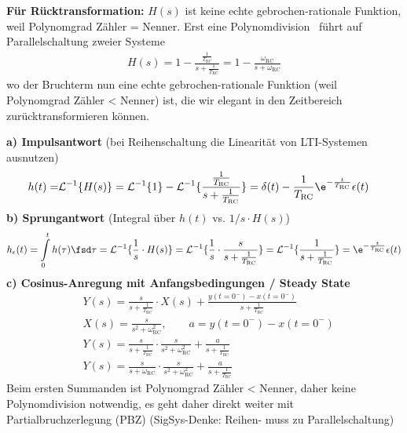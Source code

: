 \begin{Ansatz}
\textbf{Für Rücktransformation:}
$H(s)$ ist keine echte gebrochen-rationale Funktion, weil Polynomgrad Zähler = Nenner. Erst eine Polynomdivision \,  \quad führt auf Parallelschaltung zweier Systeme
\begin{align}
H(s) = 1 - \frac{\frac{1}{T_\text{RC}}}{s + \frac{1}{T_\text{RC}}} =
1 - \frac{\omega_\text{RC}}{s + \omega_\text{RC}}
\end{align}
%
wo der Bruchterm nun eine echte gebrochen-rationale Funktion (weil Polynomgrad Zähler < Nenner) ist, die wir elegant in den Zeitbereich zurücktransformieren können.
\end{Ansatz}

\begin{Loesung}
\textbf{a) Impulsantwort} (bei Reihenschaltung die Linearität von LTI-Systemen ausnutzen)
\begin{align}
h(t) =& \mathcal{L}^{-1}\{H(s)\} = \mathcal{L}^{-1}\{1\} - \mathcal{L}^{-1}\{\frac{\frac{1}{T_\text{RC}}}{s + \frac{1}{T_\text{RC}}}\}
= \delta(t) - \frac{1}{T_\text{RC}} \e^{-\frac{t}{T_\text{RC}}} \epsilon(t)
\end{align}
%
\textbf{b) Sprungantwort} (Integral über $h(t)$ vs. $1/s \cdot H(s)$)
\begin{align}
h_\epsilon(t) = \int\limits_{0}^{t} h(\tau) \fsd \tau = \mathcal{L}^{-1}\{\frac{1}{s} \cdot H(s)\} =
\mathcal{L}^{-1}\{\frac{1}{s} \cdot \frac{s}{s + \frac{1}{T_\text{RC}}}\}
=
\mathcal{L}^{-1}\{\frac{1}{s + \frac{1}{T_\text{RC}}}\} = \e^{-\frac{t}{T_\text{RC}}} \epsilon(t)
\end{align}
%
\textbf{c) Cosinus-Anregung mit Anfangsbedingungen / Steady State}
\begin{align}
&Y(s) = \frac{s}{s + \frac{1}{T_\text{RC}}} \cdot X(s) + \frac{y(t=0^-) - x(t=0^-)}{s + \frac{1}{T_\text{RC}}}\\
&X(s) = \frac{s}{s^2+\omega_\text{RC}^2}, \qquad a = y(t=0^-) - x(t=0^-)\\
&Y(s) = \frac{s}{s + \frac{1}{T_\text{RC}}} \cdot \frac{s}{s^2+\omega_\text{RC}^2} + \frac{a}{s + \frac{1}{T_\text{RC}}}\\
&Y(s) = \frac{s}{s + \omega_\text{RC}} \cdot \frac{s}{s^2+\omega_\text{RC}^2} + \frac{a}{s + \frac{1}{T_\text{RC}}}
\end{align}
Beim ersten Summanden ist Polynomgrad Zähler < Nenner, daher keine Polynomdivision notwendig, es geht daher direkt weiter mit Partialbruchzerlegung (PBZ) (SigSys-Denke: Reihen- muss zu Parallelschaltung)

\end{Loesung}
